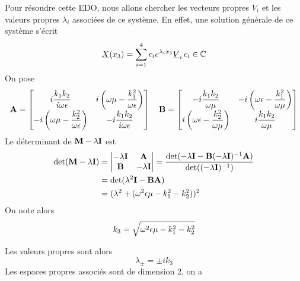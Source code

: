     Pour résoudre cette EDO, nous allons chercher les vecteurs propres $V_i$ et les valeurs propres $\lambda_i$ associées de ce système. En effet, une solution générale de ce système s'écrit
    \begin{equation}
        \underline{X}(x_3)= \sum\limits_{i=1}^{4}c_i e^{\lambda_i x_3} \underline{V}_i \, c_i \in \mathbb C
    \end{equation}
    On pose 
    \begin{equation}
        \mathbf{A} = \begin{bmatrix}
            i\dfrac{k_1k_2}{i\omega\epsilon} & i\left(\omega\mu - \dfrac{k_1^2}{\omega\epsilon}\right) \\
            -i\left(\omega\mu - \dfrac{k_2^2}{\omega\epsilon}\right) & -i\dfrac{k_1k_2}{i\omega\epsilon} \\
        \end{bmatrix}
        \quad
        \mathbf{B} = \begin{bmatrix}
            -i\dfrac{k_1k_2}{\omega\mu} & -i\left(\omega\epsilon - \dfrac{k_1^2}{\omega\mu}\right) \\
            i\left(\omega\epsilon - \dfrac{k_2^2}{\omega\mu}\right) & i\dfrac{k_1k_2}{\omega\mu} \\
        \end{bmatrix}
    \end{equation}
    Le déterminant de $\mathbf{M}-\lambda \mathbf{I}$ est
    \begin{align*}
        \det(\mathbf{M}-\lambda \mathbf{I}) &= 
        \begin{vmatrix}
            -\lambda \mathbf{I} & \mathbf{A} \\
            \mathbf{B} & -\lambda \mathbf{I}
        \end{vmatrix}
            = \dfrac{\det(- \lambda \mathbf{I} - \mathbf{B}(-\lambda \mathbf{I})^{-1} \mathbf{A})}{\det((-\lambda \mathbf{I})^{-1})} \\
            &= \det(\lambda^2 \mathbf{I} - \mathbf{B}\mathbf{A}) \\
            &= (\lambda^2 + (\omega^2\epsilon\mu - k_1^2 -k_2^2))^2
    \end{align*}
    On note alors 
    \begin{equation}
    k_3=\sqrt{\omega^2\epsilon\mu - k_1^2 -k_2^2}
    \end{equation}

    Les valeurs propres sont alors 
    \begin{equation}
        \lambda_\pm = \pm i k_3
    \end{equation}
    Les espaces propres associés sont de dimension 2, on a 

